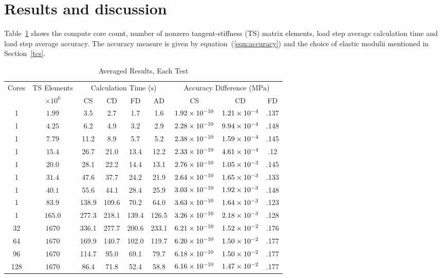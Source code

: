\documentclass[preprint,12pt]{elsarticle}
\begin{document}
\section{Results and discussion}
\label{sec:Res}
%
Table~\ref{tab:results} shows the compute core count, number of nonzero tangent-stiffness (TS) matrix elements, load step average calculation time and load step average accuracy. The accuracy measure is given by equation~(\ref{eqn:accuracy}) and the choice of elastic modulii mentioned in Section~\ref{tcs}.
%
\begin{table}[!tbp]    
  \scriptsize
  \centering
        \caption{Averaged Results, Each Test} \label{tab:results}   
       \begin{tabular}{c c c c c c c c c}
         \toprule
         Cores & TS Elements & \multicolumn{4}{c}{Calculation Time ($\si{\second}$)} & \multicolumn{3}{c}{Accuracy Difference ($\si{\mega\pascal}$)} \\ 
         & $\times 10^6$ & CS & CD & FD & AD & CS & CD & FD \\
        \midrule
        1 & $\num{1.99}$  & 3.5 & 2.7 & 1.7 & 1.6 & $\num{1.92E-10}$ & $\num{1.21E-4}$ & .137 \\
        1 & $\num{4.25}$  & 6.2& 4.9& 3.2& 2.9 & $\num{2.28E-10}$ & $\num{9.94E-4}$ & .148 \\
        1 & $\num{7.79}$  & 11.2& 8.9& 5.7& 5.2 & $\num{2.38E-10}$ & $\num{1.59E-4}$ & .145\\
        1 & $\num{15.4}$  & 26.7& 21.0& 13.4& 12.2 & $\num{2.33E-10}$ & $\num{4.61E-4}$ & .12 \\
        1 & $\num{20.0}$  & 28.1& 22.2& 14.4& 13.1 & $\num{2.76E-10}$ & $\num{1.05E-3}$ & .145 \\
        1 & $\num{31.4}$  & 47.6& 37.7& 24.2& 21.9 & $\num{2.64E-10}$ & $\num{1.65E-3}$ & .133 \\
        1 & $\num{40.1}$  & 55.6& 44.1& 28.4& 25.9 & $\num{3.03E-10}$ & $\num{1.92E-3}$ & .148 \\
        1 & $\num{83.9}$  & 138.9& 109.6& 70.2& 64.0 & $\num{3.63E-10}$ & $\num{1.64E-3}$ & .123 \\
        1 & $\num{165.0}$  & 277.3& 218.1& 139.4& 126.5 & $\num{3.26E-10}$ & $\num{2.18E-3}$ & .128 \\
        32 & $\num{1670}$  & 336.1& 277.7& 200.6& 233.1 & $\num{6.21E-10}$ & $\num{1.52E-2}$ & .176 \\
        64 & $\num{1670}$  & 169.9& 140.7& 102.0& 119.7 & $\num{6.20E-10}$ & $\num{1.50E-2}$ & .177 \\
        96 & $\num{1670}$  & 114.7& 95.0& 69.1 & 79.7 & $\num{6.18E-10}$ & $\num{1.50E-2}$ & .177 \\
        128 & $\num{1670}$  & 86.4& 71.8& 52.4 &58.8 & $\num{6.16E-10}$ & $\num{1.47E-2}$ & .177 \\
        \bottomrule
    \end{tabular}
\end{table}
\end{document}
